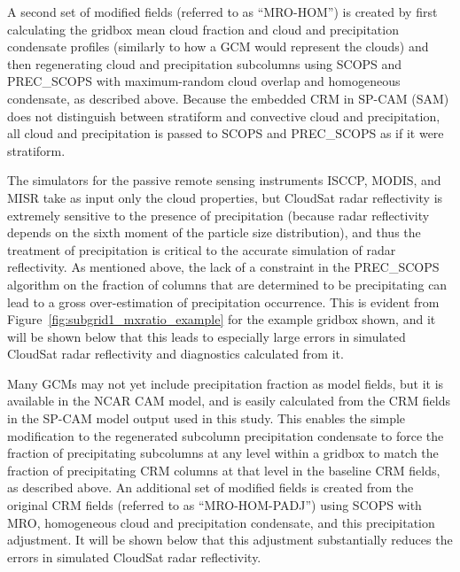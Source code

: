 A second set of modified fields (referred to as ``MRO-HOM'') is created
by first calculating the gridbox mean cloud fraction and cloud and
precipitation condensate profiles (similarly to how a GCM would
represent the clouds) and then regenerating cloud and precipitation
subcolumns using SCOPS and PREC\_SCOPS with maximum-random cloud overlap
and homogeneous condensate, as described above. Because the embedded CRM
in SP-CAM (SAM) does not distinguish between stratiform and convective
cloud and precipitation, all cloud and precipitation is passed to SCOPS
and PREC\_SCOPS as if it were stratiform.

The simulators for the passive remote sensing instruments ISCCP, MODIS,
and MISR take as input only the cloud properties, but CloudSat radar
reflectivity is extremely sensitive to the presence of precipitation
(because radar reflectivity depends on the sixth moment of the particle
size distribution), and thus the treatment of precipitation is critical
to the accurate simulation of radar reflectivity. As mentioned above,
the lack of a constraint in the PREC\_SCOPS algorithm on the fraction of
columns that are determined to be precipitating can lead to a gross
over-estimation of precipitation occurrence. This is evident from
Figure~\ref{fig:subgrid1_mxratio_example} for the example gridbox shown,
and it will be shown below that this leads to especially large errors in
simulated CloudSat radar reflectivity and diagnostics calculated from
it.

Many GCMs may not yet include precipitation fraction as model fields,
but it is available in the NCAR CAM model, and is easily calculated from
the CRM fields in the SP-CAM model output used in this study. This
enables the simple modification to the regenerated subcolumn
precipitation condensate to force the fraction of precipitating
subcolumns at any level within a gridbox to match the fraction of
precipitating CRM columns at that level in the baseline CRM fields, as
described above. An additional set of modified fields is created from
the original CRM fields (referred to as ``MRO-HOM-PADJ'') using SCOPS
with MRO, homogeneous cloud and precipitation condensate, and this
precipitation adjustment. It will be shown below that this adjustment
substantially reduces the errors in simulated CloudSat radar
reflectivity.

